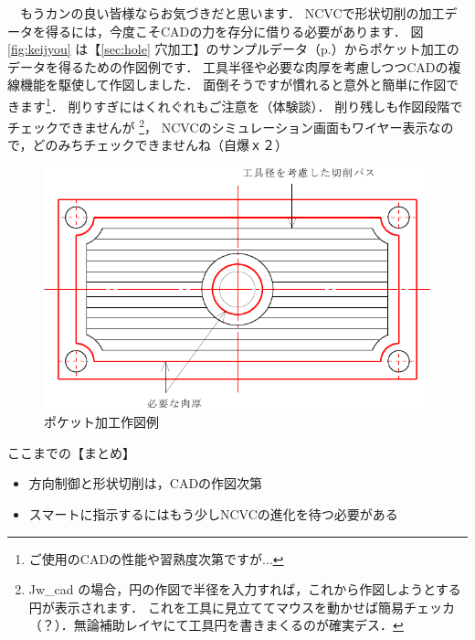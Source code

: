 　もうカンの良い皆様ならお気づきだと思います．
NCVCで形状切削の加工データを得るには，今度こそCADの力を存分に借りる必要があります．
図\ref{fig:keijyou} は【\ref{sec:hole} 穴加工】のサンプルデータ（p.\pageref{fig:sample2.pdf}）からポケット加工のデータを得るための作図例です．
工具半径や必要な肉厚を考慮しつつCADの複線機能を駆使して作図しました．
面倒そうですが慣れると意外と簡単に作図できます\footnote{ご使用のCADの性能や習熟度次第ですが...}．
削りすぎにはくれぐれもご注意を（体験談）．
削り残しも作図段階でチェックできませんが
\footnote{Jw\_cad の場合，円の作図で半径を入力すれば，これから作図しようとする円が表示されます．
これを工具に見立ててマウスを動かせば簡易チェッカ（？）．無論補助レイヤにて工具円を書きまくるのが確実デス．}，
NCVCのシミュレーション画面もワイヤー表示なので，どのみちチェックできませんね（自爆ｘ２）

\begin{figure}[H]
\centering
\includegraphics{No4/fig/keijyou-crop.pdf}
\caption{ポケット加工作図例}
\label{fig:keijyou.pdf}
\end{figure}

\vspace*{2zh}
\begin{itembox}[l]{ここまでの【まとめ】}
\begin{itemize}
\item 方向制御と形状切削は，CADの作図次第
\item スマートに指示するにはもう少しNCVCの進化を待つ必要がある
\end{itemize}
\end{itembox}
